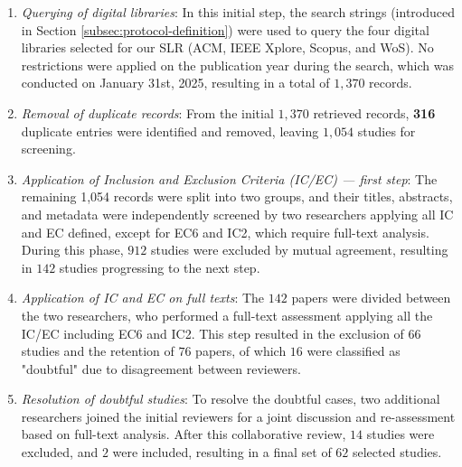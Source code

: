 \documentclass[preprint,12pt]{elsarticle}
\renewcommand{\paragraph}[1]{\vspace{1em}\noindent\textit{#1}\par}
\begin{document}
\begin{enumerate}
\item \textit{Querying of digital libraries}: In this initial step, the search strings (introduced in Section \ref{subsec:protocol-definition}) were used to query the four digital libraries selected for our SLR (ACM, IEEE Xplore, Scopus, and WoS). No restrictions were applied on the publication year during the search, which was conducted on January 31st, 2025, resulting in a total of $1,370$ records.

\item \textit{Removal of duplicate records}: From the initial $1,370$ retrieved records, \textbf{316} duplicate entries were identified and removed, leaving $1,054$ studies for  screening.

\item \textit{Application of Inclusion and Exclusion Criteria (IC/EC) — first step}: The remaining 1,054 records were split into two groups, and their titles, abstracts, and metadata were independently screened by two researchers applying all IC and EC defined, except for EC6 and IC2, which require full-text analysis. During this phase, $912$ studies were excluded by mutual agreement, resulting in $142$ studies progressing to the next step.

\item \textit{Application of IC and EC on full texts}: The $142$ papers were divided between the two researchers, who performed a full-text assessment applying all the IC/EC including EC6 and IC2. This step resulted in the exclusion of $66$ studies and the retention of $76$ papers, of which $16$ were classified as "doubtful" due to disagreement between reviewers.

\item \textit{Resolution of doubtful studies}: To resolve the doubtful cases, two additional researchers joined the initial reviewers for a joint discussion and re-assessment based on full-text analysis. After this collaborative review, $14$ studies were excluded, and $2$ were included, resulting in a final set of $62$ selected studies.
\end{enumerate}

\end{document}
